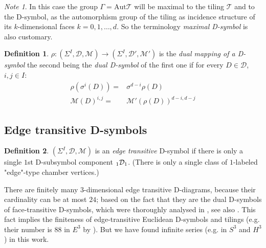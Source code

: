 \documentclass[12pt,a4paper]{article}
\numberwithin{equation}{section}
\newcommand{\leftsub}[2]{{\vphantom{#2}}_{#1}{#2}}
\theoremstyle{plain}%
\newtheorem{prop}[thm]{Proposition}
\theoremstyle{definition}
\newtheorem{defn}{Definition}[section]
\theoremstyle{remark}
\newtheorem*{note}{Note}
\begin{document}
\begin{note}
  In this case the group $\Gamma=\mathrm{Aut}\mathcal{T}$ will be maximal to the tiling
  $\mathcal{T}$ and to the D-symbol, as the automorphism group of the tiling as
  incidence structure of its $k$-dimensional faces $k=0,1,\ldots,d$. So the
  terminology {\em maximal D-symbol} is also customary.
\end{note}

\begin{defn}
  $\rho: (\Sigma^I,\mathcal{D},\mathcal{M}) \rightarrow
  (\Sigma^I,\mathcal{D}',\mathcal{M}')$ is the {\em dual mapping of a D-symbol}
  the second being the {\em dual D-symbol} of the first one if for every $D\in \mathcal{D}$, $i,j
  \in I$:
  \begin{align}
    \rho(\sigma^i(D))= & \sigma^{d-i}\rho(D) \\
    \mathcal{M}(D)^{i,j}= & \mathcal{M}'(\rho(D))^{d-i,d-j}
  \end{align}
\end{defn}


\subsection{Edge transitive D-symbols}
\label{sec:edge_transitive}

\begin{defn}
  $(\Sigma^I,\mathcal{D},\mathcal{M})$ is an {\em edge transitive} D-symbol if
  there is only a single $1$st D-subsymbol component $\leftsub{1}{\mathcal{D}}_1$. (There is only a single class of
  $1$-labeled "edge"-type chamber vertices.)
\end{defn}

There are finitely many $3$-dimensional edge transitive D-diagrams, because their
cardinality can be at most $24$; based on the fact that they are the dual
D-symbols of face-transitive D-symbols, which were thoroughly analysed in
\cite{DHM93}, see also \cite{DDH98}. This fact implies the finiteness of edge-transitive
Euclidean D-symbols and tilings (e.g. their number is $88$ in $E^3$ by
\cite{DHM93}). But we have found infinite series (e.g. in $S^3$ and $H^3$) in this work.
\end{document}
